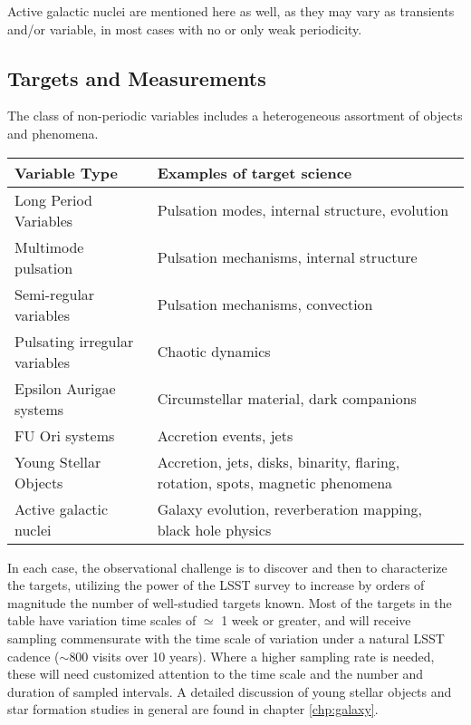 Active galactic nuclei are mentioned here as well, as they may vary as transients and/or variable, in most cases with no or only weak periodicity.


\subsection{Targets and Measurements}
\label{sec:\secname:targets}

The class of non-periodic variables includes a heterogeneous
assortment of objects and phenomena.

\begin{center}
\begin{tabular}{| p{5cm} | p{10cm} |}
\hline Variable Type & Examples of target science\\
\hline
Long Period Variables & Pulsation modes, internal structure, evolution\\
Multimode pulsation & Pulsation mechanisms, internal structure\\
Semi-regular variables & Pulsation mechanisms, convection \\
Pulsating irregular variables & Chaotic dynamics \\
Epsilon Aurigae systems & Circumstellar material, dark companions\\
FU Ori systems & Accretion events, jets\\
Young Stellar Objects & Accretion, jets, disks, binarity, flaring, rotation, spots, magnetic phenomena\\
Active galactic nuclei & Galaxy evolution, reverberation mapping, black hole physics\\
 \hline \end{tabular}
 \end{center}

In each case, the observational challenge is to discover and then to
characterize the targets, utilizing the power of the LSST survey to
increase by orders of magnitude the number of well-studied targets
known.  Most of the targets in the table have variation time scales of
$\simeq$ 1 week or greater, and will receive sampling commensurate
with the time scale of variation under a natural LSST cadence
($\sim$800 visits over 10 years).  Where a higher sampling rate is
needed, these will need customized attention to the time scale and the
number and duration of sampled intervals. 
A detailed discussion of young stellar objects and star formation studies
in general are found in chapter \autoref{chp:galaxy}.

